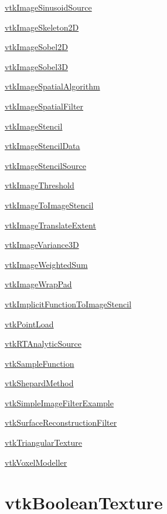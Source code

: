 \begin{DoxyItemize}
\item \hyperlink{vtkimaging_vtkimagesinusoidsource}{vtk\-Image\-Sinusoid\-Source}  
\item \hyperlink{vtkimaging_vtkimageskeleton2d}{vtk\-Image\-Skeleton2\-D}  
\item \hyperlink{vtkimaging_vtkimagesobel2d}{vtk\-Image\-Sobel2\-D}  
\item \hyperlink{vtkimaging_vtkimagesobel3d}{vtk\-Image\-Sobel3\-D}  
\item \hyperlink{vtkimaging_vtkimagespatialalgorithm}{vtk\-Image\-Spatial\-Algorithm}  
\item \hyperlink{vtkimaging_vtkimagespatialfilter}{vtk\-Image\-Spatial\-Filter}  
\item \hyperlink{vtkimaging_vtkimagestencil}{vtk\-Image\-Stencil}  
\item \hyperlink{vtkimaging_vtkimagestencildata}{vtk\-Image\-Stencil\-Data}  
\item \hyperlink{vtkimaging_vtkimagestencilsource}{vtk\-Image\-Stencil\-Source}  
\item \hyperlink{vtkimaging_vtkimagethreshold}{vtk\-Image\-Threshold}  
\item \hyperlink{vtkimaging_vtkimagetoimagestencil}{vtk\-Image\-To\-Image\-Stencil}  
\item \hyperlink{vtkimaging_vtkimagetranslateextent}{vtk\-Image\-Translate\-Extent}  
\item \hyperlink{vtkimaging_vtkimagevariance3d}{vtk\-Image\-Variance3\-D}  
\item \hyperlink{vtkimaging_vtkimageweightedsum}{vtk\-Image\-Weighted\-Sum}  
\item \hyperlink{vtkimaging_vtkimagewrappad}{vtk\-Image\-Wrap\-Pad}  
\item \hyperlink{vtkimaging_vtkimplicitfunctiontoimagestencil}{vtk\-Implicit\-Function\-To\-Image\-Stencil}  
\item \hyperlink{vtkimaging_vtkpointload}{vtk\-Point\-Load}  
\item \hyperlink{vtkimaging_vtkrtanalyticsource}{vtk\-R\-T\-Analytic\-Source}  
\item \hyperlink{vtkimaging_vtksamplefunction}{vtk\-Sample\-Function}  
\item \hyperlink{vtkimaging_vtkshepardmethod}{vtk\-Shepard\-Method}  
\item \hyperlink{vtkimaging_vtksimpleimagefilterexample}{vtk\-Simple\-Image\-Filter\-Example}  
\item \hyperlink{vtkimaging_vtksurfacereconstructionfilter}{vtk\-Surface\-Reconstruction\-Filter}  
\item \hyperlink{vtkimaging_vtktriangulartexture}{vtk\-Triangular\-Texture}  
\item \hyperlink{vtkimaging_vtkvoxelmodeller}{vtk\-Voxel\-Modeller}  
\end{DoxyItemize}\hypertarget{vtkimaging_vtkbooleantexture}{}\section{vtk\-Boolean\-Texture}\label{vtkimaging_vtkbooleantexture}
